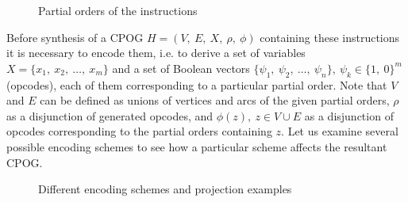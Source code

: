 \begin{figure}[h]
\caption{Partial orders of the instructions\label{fig-Four-DAGs-specifying}}
\end{figure}


Before synthesis of a CPOG $H=(V,\ E,\ X,\ \rho,\ \phi)$ containing
these instructions it is necessary to encode them, i.e. to derive
a set of variables $X=\{x_{1},\ x_{2},\ \dots,\ x_{m}\}$ and a set
of Boolean vectors $\{\psi_{1},\ \psi_{2},\ \dots,\ \psi_{n}\},\ \psi_{k}\in\{1,\ 0\}^{m}$
(opcodes), each of them corresponding to a particular partial order.
Note that $V$ and $E$ can be defined as unions of vertices and arcs
of the given partial orders, $\rho$ as a disjunction of generated
opcodes, and $\phi(z),\ z\in V\cup E$ as a disjunction of opcodes
corresponding to the partial orders containing $z$. Let us examine
several possible encoding schemes to see how a particular scheme affects
the resultant CPOG.

\begin{figure}[th]
\begin{centering}
\par\end{centering}

\begin{centering}
\par\end{centering}

\centering{}\caption{Different encoding schemes and projection examples\label{fig:Different-encoding-schemes}}
\end{figure}


